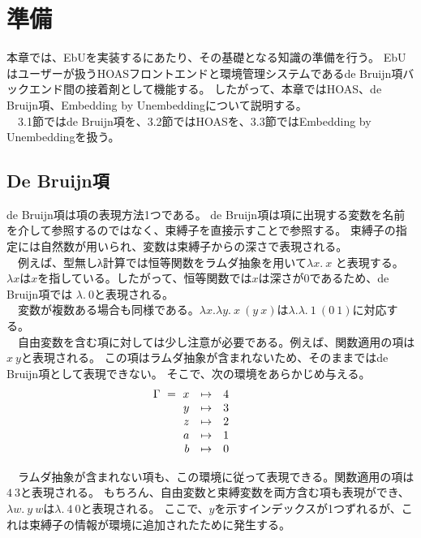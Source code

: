\documentclass[uplatex]{sumiilab-paper}
\theoremstyle{mystyle}
\numberwithin{definition}{chapter} %
\begin{document}

\chapter{準備}
本章では、EbUを実装するにあたり、その基礎となる知識の準備を行う。
EbUはユーザーが扱うHOASフロントエンドと環境管理システムであるde Bruijn項バックエンド間の接着剤として機能する。
したがって、本章ではHOAS、de Bruijn項、Embedding by Unembeddingについて説明する。\\
　3.1節ではde Bruijn項を、3.2節ではHOASを、3.3節ではEmbedding by Unembeddingを扱う。

\section{De Bruijn項}
de Bruijn項は項の表現方法1つである。
de Bruijn項は項に出現する変数を名前を介して参照するのではなく、束縛子を直接示すことで参照する。
束縛子の指定には自然数が用いられ、変数は束縛子からの深さで表現される。\\
　例えば、型無しλ計算では恒等関数をラムダ抽象を用いて$\lambda x.~x $
と表現する。$\lambda x$は$x$を指している。したがって、恒等関数では$x$は深さが0であるため、de Bruijn項では
$\lambda.~0 $と表現される。\\
　変数が複数ある場合も同様である。$\lambda x.\lambda y.~x~(y~x)$は$\lambda.\lambda.~1~(0~1)$に対応する。\\
　自由変数を含む項に対しては少し注意が必要である。例えば、関数適用の項は$x~y$と表現される。
この項はラムダ抽象が含まれないため、そのままではde Bruijn項として表現できない。
そこで、次の環境をあらかじめ与える。
\begin{align}
\begin{array}{rcl@{\qquad\qquad}r}\notag
    \Gamma ~=~ x &\mapsto& 4 \\
               y &\mapsto& 3 \\
               z &\mapsto& 2 \\
               a &\mapsto& 1 \\
               b &\mapsto& 0
\end{array}
\end{align}

　ラムダ抽象が含まれない項も、この環境に従って表現できる。関数適用の項は$4~3$と表現される。
もちろん、自由変数と束縛変数を両方含む項も表現ができ、$\lambda w.~y~w$は$\lambda.~4~0$と表現される。
ここで、$y$を示すインデックスが1つずれるが、これは束縛子の情報が環境に追加されたために発生する。
\end{document}
